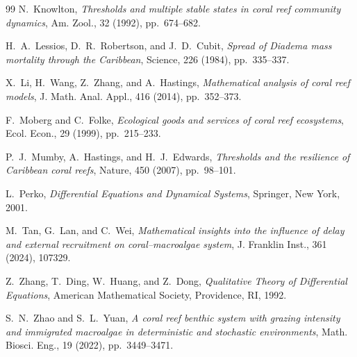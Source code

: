 \documentclass[reqno,11pt]{amsart}
\numberwithin{equation}{section}
\begin{document}
\begin{thebibliography}{99}
	{\sc N.~Knowlton}, {\em Thresholds and multiple stable states in coral reef community dynamics}, Am. Zool., 32 (1992), pp.~674--682.
	
	{\sc H.~A.~Lessios, D.~R.~Robertson, and J.~D.~Cubit}, {\em Spread of \emph{Diadema} mass mortality through the Caribbean}, Science, 226 (1984), pp.~335--337.
	
	{\sc X.~Li, H.~Wang, Z.~Zhang, and A.~Hastings}, {\em Mathematical analysis of coral reef models}, J. Math. Anal. Appl., 416 (2014), pp.~352--373.
	
	{\sc F.~Moberg and C.~Folke}, {\em Ecological goods and services of coral reef ecosystems}, Ecol. Econ., 29 (1999), pp.~215--233.
	
	{\sc P.~J.~Mumby, A.~Hastings, and H.~J.~Edwards}, {\em Thresholds and the resilience of Caribbean coral reefs}, Nature, 450 (2007), pp.~98--101.
	
	{\sc L.~Perko}, {\em Differential Equations and Dynamical Systems}, Springer, New York, 2001.
	
	{\sc M.~Tan, G.~Lan, and C.~Wei}, {\em Mathematical insights into the influence of delay and external recruitment on coral--macroalgae system}, J. Franklin Inst., 361 (2024), 107329.
	
	{\sc Z.~Zhang, T.~Ding, W.~Huang, and Z.~Dong}, {\em Qualitative Theory of Differential Equations}, American Mathematical Society, Providence, RI, 1992.
	
	{\sc S.~N.~Zhao and S.~L.~Yuan}, {\em A coral reef benthic system with grazing intensity and immigrated macroalgae in deterministic and stochastic environments}, Math. Biosci. Eng., 19 (2022), pp.~3449--3471.
	
\end{thebibliography}
\end{document}
